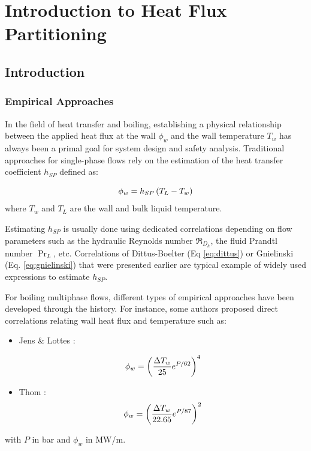 
\chapter{Introduction to Heat Flux Partitioning} %

\label{chap:HFP_bib} %

\minitoc

\section{Introduction}

\subsection{Empirical Approaches}

In the field of heat transfer and boiling, establishing a physical relationship between the applied heat flux at the wall $\phi_{w}$ and the wall temperature $T_{w}$ has always been a primal goal for system design and safety analysis. Traditional approaches for single-phase flows rely on the estimation of the heat transfer coefficient $h_{SP}$ defined as:

\begin{equation}
\phi_{w} = h_{SP} \left( T_{L} - T_{w} \right)
\end{equation}
where $T_{w}$ and $T_{L}$ are the wall and bulk liquid temperature. 

\npar
Estimating $h_{SP}$ is usually done using dedicated correlations depending on flow parameters such as the hydraulic Reynolds number $\Re_{D_{h}}$, the fluid Prandtl number $\Pr_{L}$, etc. Correlations of Dittus-Boelter (Eq \ref{eq:dittus}) or Gnielinski (Eq. \ref{eq:gnielinski}) that were presented earlier are typical example of widely used expressions to estimate $h_{SP}$.

\npar

For boiling multiphase flows, different types of empirical approaches have been developed through the history. For instance, some authors proposed direct correlations relating wall heat flux and temperature such as:

\begin{itemize}
\item Jens \& Lottes \cite{jens_analysis_1951}:

\begin{equation}
\phi_{w} = \left(  \frac{\Delta T_{w} }{25} e^{P / 62}	 \right)^{4}
\label{eq:jens_correl}
\end{equation}

\item Thom \etal \cite{thom_phiw}:
\begin{equation}
\phi_{w} = \left(  \frac{\Delta T_{w} }{22.65} e^{P / 87}	 \right)^{2}
\label{eq:thom_correl}
\end{equation}
\end{itemize} 
with $P$ in bar and $\phi_{w}$ in MW/m.

